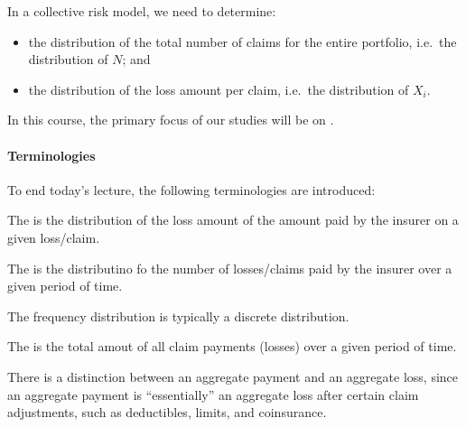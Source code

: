 \documentclass[notoc,notitlepage]{tufte-book}
\begin{document}
\begin{note}
  In a collective risk model, we need to determine:
  \begin{itemize}
    \item the distribution of the total number of claims for the entire portfolio, i.e.\ the distribution of $N$; and
    \item the distribution of the loss amount per claim, i.e.\ the distribution of $X_i$.
  \end{itemize}
\end{note}


In this course, the primary focus of our studies will be on .

\paragraph{Terminologies} To end today's lecture, the following terminologies are introduced:

\begin{defn}\label{defn:severity_distribution}
  The  is the distribution of the loss amount of the amount paid by the insurer on a given loss/claim.
\end{defn}

\begin{defn}\label{defn:frequency_distribution}
  The  is the distributino fo the number of losses/claims paid by the insurer over a given period of time.
\end{defn}

\begin{note}
  The frequency distribution is typically a discrete distribution.
\end{note}

\begin{defn}\label{defn:aggrement_payment_loss}
  The  is the total amout of all claim payments (losses) over a given period of time.
\end{defn}

\begin{note}
  There is a distinction between an aggregate payment and an aggregate loss, since an aggregate payment is ``essentially'' an aggregate loss after certain claim adjustments, such as deductibles, limits, and coinsurance.
\end{note}
\end{document}
